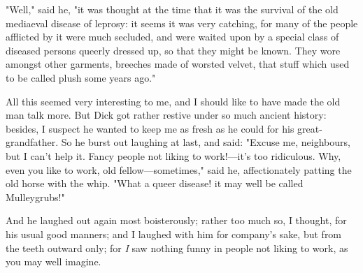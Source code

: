 "Well," said he, "it was thought at the time that it was the survival of
the old mediaeval disease of leprosy: it seems it was very catching, for
many of the people afflicted by it were much secluded, and were waited
upon by a special class of diseased persons queerly dressed up, so that
they might be known. They wore amongst other garments, breeches made of
worsted velvet, that stuff which used to be called plush some years
ago."

All this seemed very interesting to me, and I should like to have made
the old man talk more. But Dick got rather restive under so much ancient
history: besides, I suspect he wanted to keep me as fresh as he could
for his great-grandfather. So he burst out laughing at last, and said:
"Excuse me, neighbours, but I can't help it. Fancy people not liking to
work!---it's too ridiculous. Why, even you like to work, old
fellow---sometimes," said he, affectionately patting the old horse with
the whip. "What a queer disease! it may well be called Mulleygrubs!"

And he laughed out again most boisterously; rather too much so, I
thought, for his usual good manners; and I laughed with him for
company's sake, but from the teeth outward only; for \emph{I} saw
nothing funny in people not liking to work, as you may well imagine.

